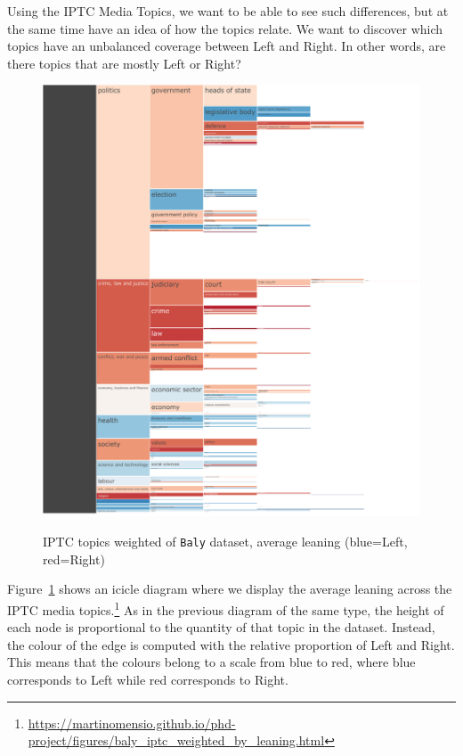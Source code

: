 Using the IPTC Media Topics, we want to be able to see such differences, but at the same time have an idea of how the topics relate.
%
We want to discover which topics have an unbalanced coverage between Left and Right. In other words, are there topics that are mostly Left or Right?


\begin{figure}[!htbp]
    \centering
    \href{https://martinomensio.github.io/phd-project/figures/baly_iptc_weighted_by_leaning.html}{\includegraphics[trim={2.65cm 0cm 0cm 0cm},clip,width=\linewidth]{figures/baly_iptc_weighted_by_leaning.pdf}}
    \caption{IPTC topics weighted of \texttt{Baly} dataset, average leaning (blue=Left, red=Right)}
    \label{fig:baly_iptc_weighted_by_leaning}
\end{figure}

Figure~\ref{fig:baly_iptc_weighted_by_leaning}
shows an icicle diagram where we display the average leaning across the IPTC media topics.\footnote{\url{https://martinomensio.github.io/phd-project/figures/baly_iptc_weighted_by_leaning.html}}
As in the previous diagram of the same type, the height of each node is proportional to the quantity of that topic in the dataset.
Instead, the colour of the edge is computed with the relative proportion of Left and Right. This means that the colours belong to a scale from blue to red, where blue corresponds to Left while red corresponds to Right.

